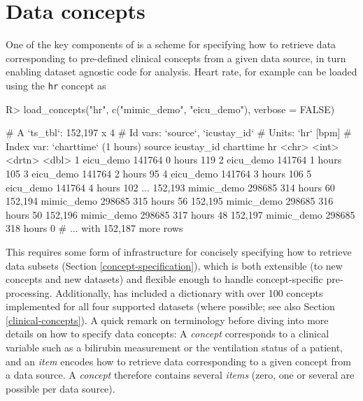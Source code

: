 \documentclass[
]{jss}
\begin{document}
\hypertarget{data-concepts}{%
\section{Data concepts}\label{data-concepts}}

One of the key components of  is a scheme for specifying how
to retrieve data corresponding to pre-defined clinical concepts from a
given data source, in turn enabling dataset agnostic code for analysis.
Heart rate, for example can be loaded using the \texttt{hr} concept as

\begin{CodeChunk}
\begin{CodeInput}
R> load_concepts("hr", c("mimic_demo", "eicu_demo"), verbose = FALSE)
\end{CodeInput}
\begin{CodeOutput}
# A `ts_tbl`: 152,197 x 4
# Id vars:    `source`, `icustay_id`
# Units:      `hr` [bpm]
# Index var:  `charttime` (1 hours)
        source     icustay_id charttime    hr
        <chr>           <int> <drtn>    <dbl>
      1 eicu_demo      141764   0 hours   119
      2 eicu_demo      141764   1 hours   105
      3 eicu_demo      141764   2 hours    95
      4 eicu_demo      141764   3 hours   106
      5 eicu_demo      141764   4 hours   102
    ...
152,193 mimic_demo     298685 314 hours    60
152,194 mimic_demo     298685 315 hours    56
152,195 mimic_demo     298685 316 hours    50
152,196 mimic_demo     298685 317 hours    48
152,197 mimic_demo     298685 318 hours     0
# ... with 152,187 more rows
\end{CodeOutput}
\end{CodeChunk}

This requires some form of infrastructure for concisely specifying how
to retrieve data subsets (Section \ref{concept-specification}), which is
both extensible (to new concepts and new datasets) and flexible enough
to handle concept-specific pre-processing. Additionally,  has
included a dictionary with over 100 concepts implemented for all four
supported datasets (where possible; see also Section
\ref{clinical-concepts}). A quick remark on terminology before diving
into more details on how to specify data concepts: A \emph{concept}
corresponds to a clinical variable such as a bilirubin measurement or
the ventilation status of a patient, and an \emph{item} encodes how to
retrieve data corresponding to a given concept from a data source. A
\emph{concept} therefore contains several \emph{items} (zero, one or
several are possible per data source).
\end{document}
